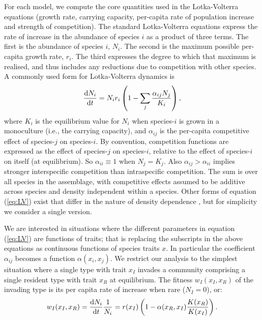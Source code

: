 \documentclass[a4paper,11pt]{article}
\begin{document}
For each model, we compute the core quantities used in the
Lotka-Volterra equations (growth rate, carrying capacity, per-capita
rate of population increase and strength of competition).  The
standard Lotka-Volterra equations express the rate of increase in the
abundance of species $i$ as a product of three terms.
%
The first is the abundance of species $i$, $N_i$.
%
The second is the maximum possible per-capita growth rate, $r_i$. The
third expresses the degree to which that maximum is realised, and
thus includes any reductions due to competition with other species. A
commonly used form for Lotka-Volterra dynamics is
%
\begin{equation}
\label{eq:LV}
\frac{\mathrm{d} N_i}{\mathrm{d} t} =
N_i r_i \left(1 - \sum_j \frac{\alpha_{ij} N_j}{K_i}\right),
\end{equation}
%
where $K_i$ is the equilibrium value for $N_i$ when species-$i$ is
grown in a monoculture (i.e., the carrying capacity), and
$\alpha_{ij}$ is the per-capita competitive effect of species-$j$ on
species-$i$.  By convention, competition functions are expressed as
the effect of species-$j$ on species-$i$, relative to the effect of
species-$i$ on itself (at equilibrium).  So $\alpha_{ii} \equiv 1$
when $N_j = K_j$. Also $\alpha_{ij} > \alpha_{ii}$
 implies stronger interspecific competition than intraspecific
competition.
%
The sum is over all species in the assemblage, with
competitive effects assumed to be additive across species and density
independent within a species.
%
Other forms of equation (\ref{eq:LV}) exist that differ in the nature
of density dependence \citep[e.g.][]{Leimar-2013}, but for simplicity
we consider a single version.

We are interested in situations where the different parameters in
equation (\ref{eq:LV}) are functions of traits; that is replacing the
subscripts in the above equations as continuous functions of species
traits $x$.  In particular the coefficient $\alpha_{ij}$ becomes a
function $\alpha(x_i, x_j)$.
%
We restrict our analysis to the simplest situation where a single
type with trait $x_I$ invades a community comprising a single
resident type with trait $x_R$ at equilibrium.  The fitness $w_I(x_I,
x_R)$ of the invading type is its per capita rate of increase when
rare ($N_I = 0$), or:
%
\begin{equation}
  \label{eq:LVi}
   w_I(x_I, x_R) = \frac{\mathrm{d} N_i}{\mathrm{d} t} \frac{1}{N_i} =
    r(x_I)\left(1 - \alpha(x_R, x_I) \frac{K(x_R)}{K(x_I)}\right).
\end{equation}
\end{document}
